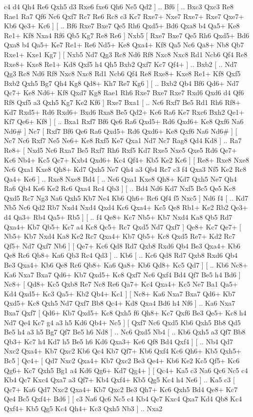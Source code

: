  c4 d4  Qh4 Re6  Qxh5 d3  Rxe6 fxe6  Qh6 Ne5  Qd2   ] .. Bf6 [ .. Bxc3  Qxc3 Re8  Rae1 Ra7  Qf6 Nc6  Qxf7 Rc7  Re6 Rc8  c3 Kc7  Rxe7+ Nxe7  Rxe7+ Rxe7  Qxe7+ Kb6  Qe3+ Kc6   ]  [ .. Bf6  Rxe7 Bxe7  Qe5 Rh6  Qxd5+ Bd6  Qxa8 b4  Qa5+ Ke8  Re1+ Kf8  Nxa4 Rf6  Qb5 Kg7  Re8 Re6   ]  Nxb5 [  Rxe7 Bxe7  Qe5 Rh6  Qxd5+ Bd6  Qxa8 b4  Qa5+ Ke7  Re1+ Re6  Nd5+ Ke8  Qxa4+ Kf8  Qa5 Nc6  Qa8+ Nb8  Qb7 Rxe1+  Kxe1 Kg7   ]  [  Nxb5 Nd7  Qg3 Rc8  Nd6 Rf8  Nxc8 Nxc8  Rd1 Ncb6  Qf4 Re8  Rxe8+ Kxe8  Re1+ Kd8  Qxf5 h4  Qh5 Bxb2  Qxf7 Kc7  Qf4+   ] .. Bxb2 [ .. Nd7  Qg3 Rc8  Nd6 Rf8  Nxc8 Nxc8  Rd1 Ncb6  Qf4 Re8  Rxe8+ Kxe8  Re1+ Kf8  Qxf5 Bxb2  Qxh5 Bg7  Qh4 Kg8  Qd8+ Kh7  Re7 Kg6   ]  [ .. Bxb2  Qb4 Bf6  Qd6+ Nd7  Qc7+ Ke8  Nd6+ Kf8  Qxd7 Kg8  Rae1 Rh6  Rxe7 Bxe7  Rxe7 Rxd6  Qxd6 d4  Qf6 Rf8  Qxf5 a3  Qxh5 Kg7  Ke2 Kf6   ]  Rxe7   Bxa1 [ .. Nc6  Rxf7 Be5  Rd1 Rh6  Rf8+ Kd7  Rxd5+ Rd6  Rxd6+ Bxd6  Rxa8 Be5  Qd2+ Ke6  Ra6 Ke7  Rxc6 Bxh2  Qe1+ Kf7  Qe6+ Kf8   ]  [ .. Bxa1  Rxf7 Bf6  Qe6 Ra6  Qxd5+ Rd6  Qxd6+ Ke8  Qxf6 Na6  Nd6#   ]  Nc7 [  Rxf7 Bf6  Qe6 Ra6  Qxd5+ Rd6  Qxd6+ Ke8  Qxf6 Na6  Nd6#   ]  [  Nc7 Nc6  Rxf7 Ne5  Ne6+ Ke8  Rxf5 Ke7  Qxa1 Nd7  Nc7 Rag8  Qd4 Kd8   ] .. Ra7    Re8+ [  Nxd5 Nc6  Rxa7 Be5  Rxf7 Rh6  Rxf5 Kd7  Rxe5 Nxe5  Qxe5 Rd6  Qe7+ Kc6  Nb4+ Kc5  Qc7+ Kxb4  Qxd6+ Kc4  Qf4+ Kb5  Ke2 Kc6   ]  [  Re8+ Rxe8  Nxe8 Nc6  Qxa1 Kxe8  Qh8+ Kd7  Qxh5 Ne7  Qh4 a3  Qb4 Rc7  c3 f4  Qxa3 Nf5  Ke2 Rc8  Qa4+ Ke6   ] .. Rxe8    Nxe8   Bd4 [ .. Nc6  Qxa1 Kxe8  Qh8+ Kd7  Qxh5 Ne7  Qh4 Ra6  Qb4 Ke6  Ke2 Rc6  Qxa4 Rc4  Qb3   ]  [ .. Bd4  Nd6 Kd7  Nxf5 Bc5  Qe5 Kc8  Qxd5 Rc7  Ng3 Na6  Qxh5 Kb7  Ne4 Kb6  Qh6+ Rc6  Qf4 f5  Nxc5   ]  Nd6   f4 [ .. Kd7  Nb5 Nc6  Qd2 Rb7  Nxd4 Nxd4  Qxd4 Kc6  Qxa4+ Kc5  Qe8 Rb1+  Ke2 Rb2  Qe3+ d4  Qa3+ Rb4  Qa5+ Rb5   ]  [ .. f4  Qe8+ Kc7  Nb5+ Kb7  Nxd4 Ka8  Qb5 Rd7  Qxa4+ Kb7  Qb5+ Kc7  a4 Kc8  Qc5+ Rc7  Qxd5 Nd7  Qxf7   ]  Qe8+   Kc7   Qe7+ [  Nb5+ Kb7  Nxd4 Ka8  Ke2 Rc7  Qxa4+ Kb7  Qb5+ Kc8  Qxd5 Re7+  Kd2 Rc7  Qf5+ Nd7  Qxf7 Nb6   ]  [  Qe7+ Kc6  Qd8 Rd7  Qxb8 Rxd6  Qb4 Be3  Qxa4+ Kb6  Qe8 Rc6  Qb8+ Ka6  Qb3 Rc4  Qd3   ] .. Kb6 [ .. Kc6  Qd8 Rd7  Qxb8 Rxd6  Qb4 Be3  Qxa4+ Kb6  Qe8 Rc6  Qb8+ Ka6  Qa8+ Kb6  Qd8+ Kc5  Qd7   ]  [ .. Kb6  Nc8+ Ka6  Nxa7 Bxa7  Qd6+ Kb7  Qxd5+ Kc8  Qxf7 Nc6  Qxf4 Bd4  Qf7 Be5  h4 Bd6   ]  Nc8+ [  Qd8+ Kc5  Qxb8 Re7  Nc8 Re6  Qa7+ Kc4  Qxa4+ Kc5  Ne7 Ba1  Qa5+ Kd4  Qxd5+ Kc3  Qa5+ Kb2  Qb4+ Kc1   ]  [  Nc8+ Ka6  Nxa7 Bxa7  Qd6+ Kb7  Qxd5+ Kc8  Qxh5 Nd7  Qxf7 Bb8  Qc4+ Kd8  Qxa4 Bd6  h4 Nf6   ] .. Ka6    Nxa7   Bxa7    Qxf7 [  Qd6+ Kb7  Qxd5+ Kc8  Qxh5 f6  Qh8+ Kc7  Qxf6 Be3  Qe5+ Kc8  h4 Nd7  Qe4 Kc7  g4 a3  h5 Kd6  Qb4+ Nc5   ]  [  Qxf7 Nc6  Qxd5 Kb6  Qxh5 Bb8  Qd5 Be5  h4 a3  h5 Bg7  Qf7 Be5  h6 Nd8   ] .. Nc6    Qxd5   Nb4 [ .. Kb6  Qxh5 a3  Qf7 Bb8  Qb3+ Kc7  h4 Kd7  h5 Be5  h6 Kd6  Qxa3+ Ke6  Qf8 Bd4  Qxf4   ]  [ .. Nb4  Qd7 Nxc2  Qxa4+ Kb7  Qxc2 Kb6  Qc4 Kb7  Qf7+ Kb6  Qxf4 Kc6  Qh6+ Kb5  Qxh5+ Bc5   ]  Qc4+ [  Qd7 Nxc2  Qxa4+ Kb7  Qxc2 Be3  Qe4+ Kb6  Ke2 Kc5  Qf5+ Kc6  Qg6+ Kc7  Qxh5 Bg1  a4 Kd6  Qg6+ Kd7  Qg4+   ]  [  Qc4+ Ka5  c3 Na6  Qc6 Nc5  c4 Kb4  Qc7 Kxc4  Qxa7 a3  Qf7+ Kb4  Qxf4+ Kb5  Qg5 Kc4  h4 Ne6   ] .. Ka5    c3 [  Qc7+ Ka6  Qd7 Nxc2  Qxa4+ Kb7  Qxc2 Be3  Qh7+ Kc6  Qxh5 Bd4  Qe8+ Kc7  Qe4 Bc5  Qxf4+ Bd6   ]  [  c3 Na6  Qc6 Nc5  c4 Kb4  Qc7 Kxc4  Qxa7 Kd4  Qb8 Kc4  Qxf4+ Kb5  Qg5 Kc4  Qh4+ Kc3  Qxh5 Nb3   ] .. Nxa2    